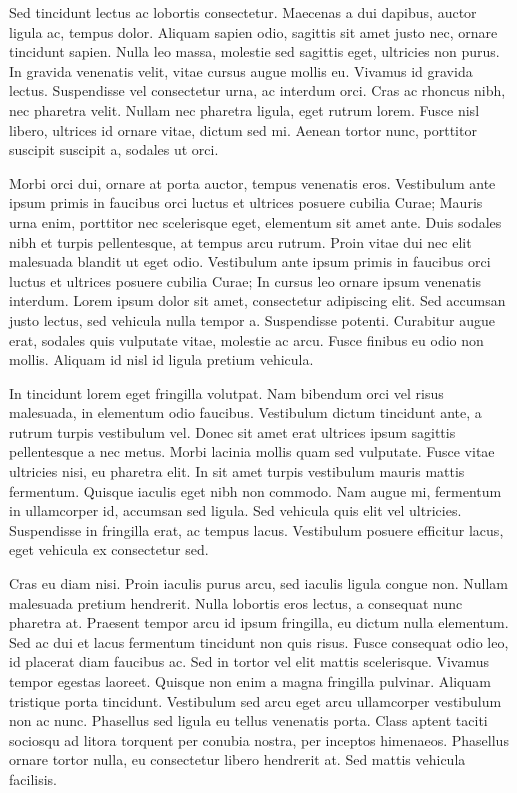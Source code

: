 \documentclass[a4paper,10pt]{article}
\theoremstyle{teorema}
\theoremstyle{plano}
\theoremstyle{titulo}
\begin{document}
Sed tincidunt lectus ac lobortis consectetur. Maecenas a dui dapibus, auctor ligula ac, tempus dolor. Aliquam sapien odio, sagittis sit amet justo nec, ornare tincidunt sapien. Nulla leo massa, molestie sed sagittis eget, ultricies non purus. In gravida venenatis velit, vitae cursus augue mollis eu. Vivamus id gravida lectus. Suspendisse vel consectetur urna, ac interdum orci. Cras ac rhoncus nibh, nec pharetra velit. Nullam nec pharetra ligula, eget rutrum lorem. Fusce nisl libero, ultrices id ornare vitae, dictum sed mi. Aenean tortor nunc, porttitor suscipit suscipit a, sodales ut orci.

Morbi orci dui, ornare at porta auctor, tempus venenatis eros. Vestibulum ante ipsum primis in faucibus orci luctus et ultrices posuere cubilia Curae; Mauris urna enim, porttitor nec scelerisque eget, elementum sit amet ante. Duis sodales nibh et turpis pellentesque, at tempus arcu rutrum. Proin vitae dui nec elit malesuada blandit ut eget odio. Vestibulum ante ipsum primis in faucibus orci luctus et ultrices posuere cubilia Curae; In cursus leo ornare ipsum venenatis interdum. Lorem ipsum dolor sit amet, consectetur adipiscing elit. Sed accumsan justo lectus, sed vehicula nulla tempor a. Suspendisse potenti. Curabitur augue erat, sodales quis vulputate vitae, molestie ac arcu. Fusce finibus eu odio non mollis. Aliquam id nisl id ligula pretium vehicula.

In tincidunt lorem eget fringilla volutpat. Nam bibendum orci vel risus malesuada, in elementum odio faucibus. Vestibulum dictum tincidunt ante, a rutrum turpis vestibulum vel. Donec sit amet erat ultrices ipsum sagittis pellentesque a nec metus. Morbi lacinia mollis quam sed vulputate. Fusce vitae ultricies nisi, eu pharetra elit. In sit amet turpis vestibulum mauris mattis fermentum. Quisque iaculis eget nibh non commodo. Nam augue mi, fermentum in ullamcorper id, accumsan sed ligula. Sed vehicula quis elit vel ultricies. Suspendisse in fringilla erat, ac tempus lacus. Vestibulum posuere efficitur lacus, eget vehicula ex consectetur sed.

Cras eu diam nisi. Proin iaculis purus arcu, sed iaculis ligula congue non. Nullam malesuada pretium hendrerit. Nulla lobortis eros lectus, a consequat nunc pharetra at. Praesent tempor arcu id ipsum fringilla, eu dictum nulla elementum. Sed ac dui et lacus fermentum tincidunt non quis risus. Fusce consequat odio leo, id placerat diam faucibus ac. Sed in tortor vel elit mattis scelerisque. Vivamus tempor egestas laoreet. Quisque non enim a magna fringilla pulvinar. Aliquam tristique porta tincidunt. Vestibulum sed arcu eget arcu ullamcorper vestibulum non ac nunc. Phasellus sed ligula eu tellus venenatis porta. Class aptent taciti sociosqu ad litora torquent per conubia nostra, per inceptos himenaeos. Phasellus ornare tortor nulla, eu consectetur libero hendrerit at. Sed mattis vehicula facilisis.
\end{document}
